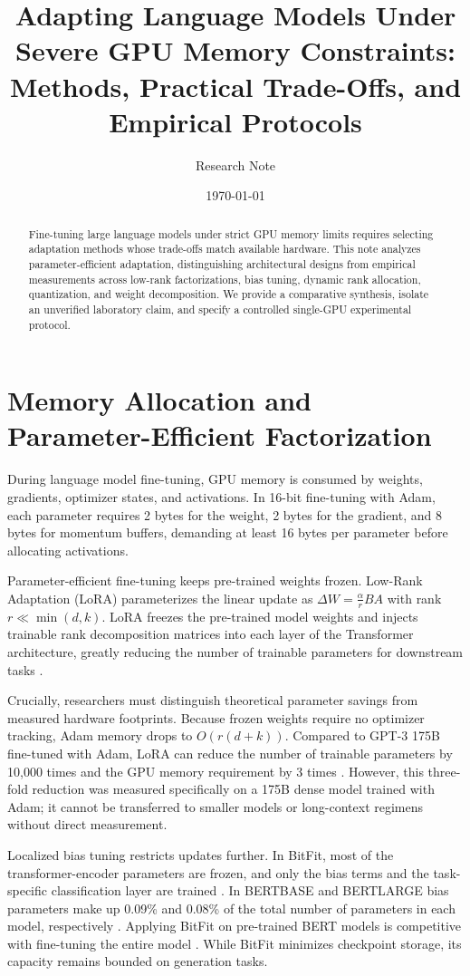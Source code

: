 \documentclass[11pt,a4paper]{article}
\title{\textbf{Adapting Language Models Under Severe GPU Memory Constraints:\\
Methods, Practical Trade-Offs, and Empirical Protocols}}
\author{Research Note}
\date{\today}
\begin{document}
\maketitle

\begin{abstract}
Fine-tuning large language models under strict GPU memory limits requires selecting adaptation methods whose trade-offs match available hardware. This note analyzes parameter-efficient adaptation, distinguishing architectural designs from empirical measurements across low-rank factorizations, bias tuning, dynamic rank allocation, quantization, and weight decomposition. We provide a comparative synthesis, isolate an unverified laboratory claim, and specify a controlled single-GPU experimental protocol.
\end{abstract}

\section{Memory Allocation and Parameter-Efficient Factorization}

During language model fine-tuning, GPU memory is consumed by weights, gradients, optimizer states, and activations. In 16-bit fine-tuning with Adam, each parameter requires 2 bytes for the weight, 2 bytes for the gradient, and 8 bytes for momentum buffers, demanding at least 16 bytes per parameter before allocating activations.

Parameter-efficient fine-tuning keeps pre-trained weights frozen. Low-Rank Adaptation (LoRA) parameterizes the linear update as $\Delta W = \frac{\alpha}{r} B A$ with rank $r \ll \min(d, k)$. LoRA freezes the pre-trained model weights and injects trainable rank decomposition matrices into each layer of the Transformer architecture, greatly reducing the number of trainable parameters for downstream tasks \cite{hu2021lora}.

Crucially, researchers must distinguish theoretical parameter savings from measured hardware footprints. Because frozen weights require no optimizer tracking, Adam memory drops to $O(r(d + k))$. Compared to GPT-3 175B fine-tuned with Adam, LoRA can reduce the number of trainable parameters by 10,000 times and the GPU memory requirement by 3 times \cite{hu2021lora}. However, this three-fold reduction was measured specifically on a 175B dense model trained with Adam; it cannot be transferred to smaller models or long-context regimens without direct measurement.

Localized bias tuning restricts updates further. In BitFit, most of the transformer-encoder parameters are frozen, and only the bias terms and the task-specific classification layer are trained \cite{benzaken2021bitfit}. In BERTBASE and BERTLARGE bias parameters make up 0.09\% and 0.08\% of the total number of parameters in each model, respectively \cite{benzaken2021bitfit}. Applying BitFit on pre-trained BERT models is competitive with fine-tuning the entire model \cite{benzaken2021bitfit}. While BitFit minimizes checkpoint storage, its capacity remains bounded on generation tasks.
\end{document}

